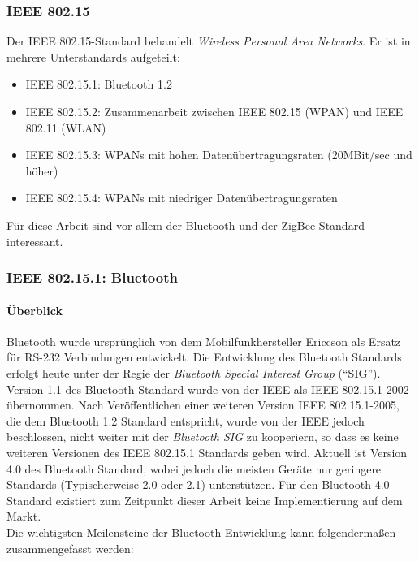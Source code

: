         \subsubsection{IEEE 802.15}
            Der IEEE 802.15-Standard behandelt \textsl{Wireless Personal Area Networks}. Er ist in mehrere Unterstandards
            aufgeteilt:

             \begin{itemize}
                \item{IEEE 802.15.1:} Bluetooth 1.2
                \item{IEEE 802.15.2:} Zusammenarbeit zwischen IEEE 802.15 (WPAN) und IEEE 802.11 (WLAN)
                \item{IEEE 802.15.3:} WPANs mit hohen Datenübertragungsraten (20MBit/sec und höher)
                \item{IEEE 802.15.4:} WPANs mit niedriger Datenübertragungsraten
            \end{itemize}

            Für diese Arbeit sind vor allem der Bluetooth und der ZigBee Standard interessant. 

        \subsubsection{IEEE 802.15.1: Bluetooth}
            \paragraph{Überblick}
                Bluetooth wurde ursprünglich von dem Mobilfunkhersteller Ericcson als Ersatz für
                RS-232 Verbindungen entwickelt. Die Entwicklung des Bluetooth Standards erfolgt
                heute unter der Regie der \textsl{Bluetooth Special Interest Group} ("`SIG"').
                Version 1.1 des Bluetooth Standard wurde 
                von der IEEE als IEEE 802.15.1-2002 übernommen. Nach Veröffentlichen einer
                weiteren Version IEEE 802.15.1-2005, die dem Bluetooth 1.2 Standard entspricht,
                wurde von der IEEE jedoch beschlossen, nicht weiter mit der \textsl{Bluetooth SIG}
                zu kooperiern, so dass es keine weiteren Versionen des IEEE 802.15.1 Standards 
                geben wird. Aktuell ist Version 4.0 des Bluetooth Standard, wobei jedoch die
                meisten Geräte nur geringere Standards (Typischerweise 2.0 oder 2.1) unterstützen.
                Für den Bluetooth 4.0 Standard existiert zum Zeitpunkt dieser Arbeit keine 
                Implementierung auf dem Markt.\\
                Die wichtigsten Meilensteine der Bluetooth-Entwicklung kann folgendermaßen
                zusammengefasst werden:

